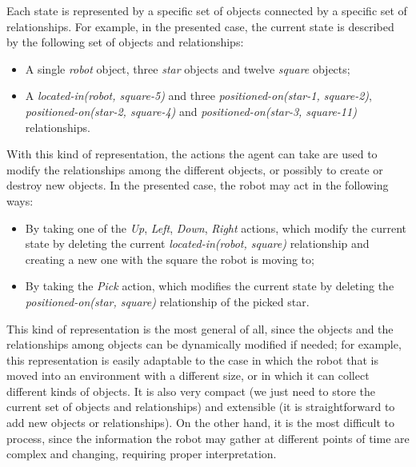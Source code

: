\documentclass[letterpaper,headings=standardclasses]{scrartcl}
\begin{document}
Each state is represented by a specific set of objects connected by a specific set of relationships. For example, in the presented case, the current state is described by the following set of objects and relationships:

\begin{itemize}

\item A single \emph{robot} object, three \emph{star} objects and twelve \emph{square} objects;
\item A \emph{located-in(robot, square-5)} and three \emph{positioned-on(star-1, square-2)}, \emph{positioned-on(star-2, square-4)} and \emph{positioned-on(star-3, square-11)} relationships.

\end{itemize}

With this kind of representation, the actions the agent can take are used to modify the relationships among the different objects, or possibly to create or destroy new objects. In the presented case, the robot may act in the following ways:

\begin{itemize}

\item By taking one of the \emph{Up}, \emph{Left}, \emph{Down}, \emph{Right} actions, which modify the current state by deleting the current \emph{located-in(robot, square)} relationship and creating a new one with the square the robot is moving to;

\item By taking the \emph{Pick} action, which modifies the current state by deleting the \emph{positioned-on(star, square)} relationship of the picked star.

\end{itemize}

This kind of representation is the most general of all, since the objects and the relationships among objects can be dynamically modified if needed; for example, this representation is easily adaptable to the case in which the robot that is moved into an environment with a different size, or in which it can collect different kinds of objects. It is also very compact (we just need to store the current set of objects and relationships) and extensible (it is straightforward to add new objects or relationships). On the other hand, it is the most difficult to process, since the information the robot may gather at different points of time are complex and changing, requiring proper interpretation.
\end{document}
